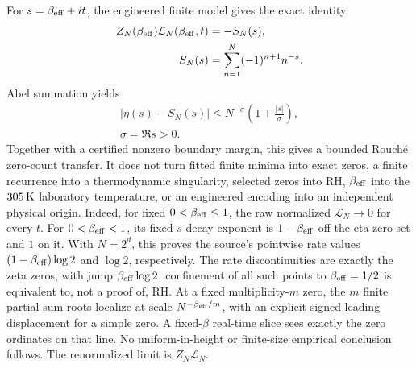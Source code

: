 \documentclass[10pt,a4paper,twocolumn]{extarticle}
\begin{document}
For \(s=\beta_{\rm eff}+it\), the engineered finite model gives the exact
identity
\[
 \begin{aligned}
 Z_N(\beta_{\rm eff})\mathcal L_N(\beta_{\rm eff},t)&=-S_N(s),\\
 S_N(s)&=\sum_{n=1}^{N}(-1)^{n+1}n^{-s}.
 \end{aligned}
\]
Abel summation yields
\[
 \begin{gathered}
 |\eta(s)-S_N(s)|
 \le N^{-\sigma}\!\left(1+\frac{|s|}{\sigma}\right),\\[-0.2em]
 \sigma=\Re s>0.
 \end{gathered}
\]
Together with a certified nonzero boundary margin, this gives a bounded
Rouch\'e zero-count transfer.  It does not turn fitted finite minima into
exact zeros, a finite recurrence into a thermodynamic singularity, selected
zeros into RH, \(\beta_{\rm eff}\) into the \(305\,{\rm K}\) laboratory
temperature, or an engineered encoding into an independent physical origin.
Indeed, for fixed \(0<\beta_{\rm eff}\le1\), the raw normalized
\(\mathcal L_N\to0\) for every \(t\).  For \(0<\beta_{\rm eff}<1\), its
fixed-\(s\) decay exponent is \(1-\beta_{\rm eff}\) off the eta zero set and
\(1\) on it.  With \(N=2^d\), this proves the source's pointwise rate values
\((1-\beta_{\rm eff})\log2\) and \(\log2\), respectively.  The rate
discontinuities are exactly the zeta zeros, with jump
\(\beta_{\rm eff}\log2\); confinement of all such points to
\(\beta_{\rm eff}=1/2\) is equivalent to, not a proof of, RH.  At a fixed
multiplicity-\(m\) zero, the \(m\) finite partial-sum roots localize at scale
\(N^{-\beta_{\rm eff}/m}\), with an explicit signed leading displacement for
a simple zero.  A fixed-\(\beta\) real-time slice sees exactly the zero
ordinates on that line.  No uniform-in-height or finite-size empirical
conclusion follows.  The renormalized limit is \(Z_N\mathcal L_N\).
\end{document}
